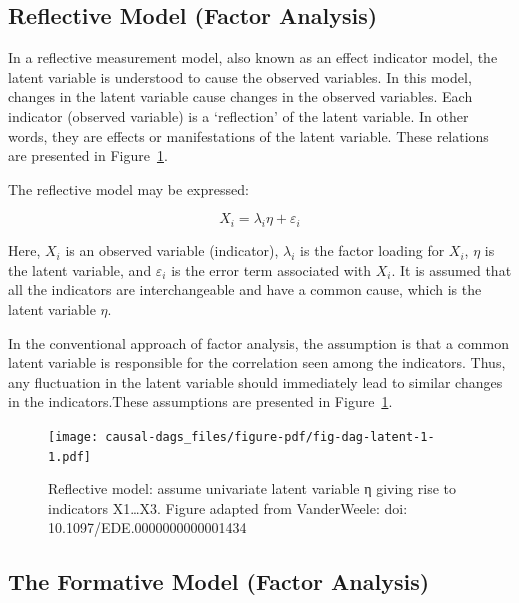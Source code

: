 \documentclass[
  singlecolumn]{report}
\begin{document}
\hypertarget{reflective-model-factor-analysis}{%
\subsection{Reflective Model (Factor
Analysis)}\label{reflective-model-factor-analysis}}

In a reflective measurement model, also known as an effect indicator
model, the latent variable is understood to cause the observed
variables. In this model, changes in the latent variable cause changes
in the observed variables. Each indicator (observed variable) is a
`reflection' of the latent variable. In other words, they are effects or
manifestations of the latent variable. These relations are presented in
Figure~\ref{fig-dag-latent-1}.

The reflective model may be expressed:

\[X_i = \lambda_i \eta + \varepsilon_i\]

Here, \(X_i\) is an observed variable (indicator), \(\lambda_i\) is the
factor loading for \(X_i\), \(\eta\) is the latent variable, and
\(\varepsilon_i\) is the error term associated with \(X_i\). It is
assumed that all the indicators are interchangeable and have a common
cause, which is the latent variable \(\eta\).

In the conventional approach of factor analysis, the assumption is that
a common latent variable is responsible for the correlation seen among
the indicators. Thus, any fluctuation in the latent variable should
immediately lead to similar changes in the indicators.These assumptions
are presented in Figure~\ref{fig-dag-latent-1}.

\begin{figure}

{\centering \texttt{[image: causal-dags\_files/figure-pdf/fig-dag-latent-1-1.pdf]}

}

\caption{\label{fig-dag-latent-1}Reflective model: assume univariate
latent variable η giving rise to indicators X1\ldots X3. Figure adapted
from VanderWeele: doi: 10.1097/EDE.0000000000001434}

\end{figure}

\hypertarget{the-formative-model-factor-analysis}{%
\subsection{The Formative Model (Factor
Analysis)}\label{the-formative-model-factor-analysis}}
\end{document}
